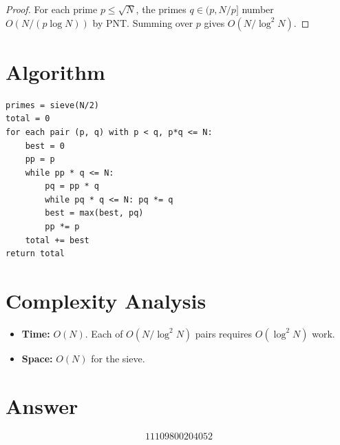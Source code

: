 \documentclass[a4paper,12pt]{article}
\begin{document}
\begin{proof}
For each prime $p \le \sqrt{N}$, the primes $q \in (p, N/p]$ number $O(N/(p \log N))$ by PNT. Summing over $p$ gives $O(N/\log^2 N)$.
\end{proof}

\section{Algorithm}

\begin{verbatim}
primes = sieve(N/2)
total = 0
for each pair (p, q) with p < q, p*q <= N:
    best = 0
    pp = p
    while pp * q <= N:
        pq = pp * q
        while pq * q <= N: pq *= q
        best = max(best, pq)
        pp *= p
    total += best
return total
\end{verbatim}

\section{Complexity Analysis}
\begin{itemize}
    \item \textbf{Time:} $O(N)$. Each of $O(N/\log^2 N)$ pairs requires $O(\log^2 N)$ work.
    \item \textbf{Space:} $O(N)$ for the sieve.
\end{itemize}

\section{Answer}

\[
\boxed{11109800204052}
\]
\end{document}
